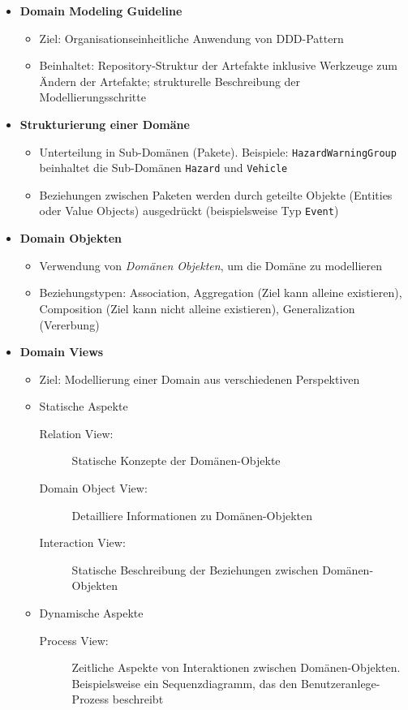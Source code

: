 \begin{itemize}
	\item \textbf{Domain Modeling Guideline}
	\begin{itemize}
		\item Ziel: Organisationseinheitliche Anwendung von DDD-Pattern
		\item Beinhaltet: Repository-Struktur der Artefakte inklusive Werkzeuge zum Ändern der Artefakte; strukturelle Beschreibung der Modellierungsschritte
	\end{itemize}
	\item \textbf{Strukturierung einer Domäne}
	\begin{itemize}
		\item Unterteilung in Sub-Domänen (Pakete). Beispiele: \texttt{HazardWarningGroup} beinhaltet die Sub-Domänen \texttt{Hazard} und \texttt{Vehicle}
		\item Beziehungen zwischen Paketen werden durch geteilte Objekte (Entities oder Value Objects) ausgedrückt (beispielsweise Typ \texttt{Event})
	\end{itemize}
	\item \textbf{Domain Objekten}
	\begin{itemize}
		\item Verwendung von \textit{Domänen Objekten}, um die Domäne zu modellieren
		\item Beziehungstypen: Association, Aggregation (Ziel kann alleine existieren), Composition (Ziel kann nicht alleine existieren), Generalization (Vererbung)
	\end{itemize}
	\item \textbf{Domain Views}
	\begin{itemize}
		\item Ziel: Modellierung einer Domain aus verschiedenen Perspektiven
		\item Statische Aspekte
		\begin{description}
			\item[Relation View:] Statische Konzepte der Domänen-Objekte
			\item[Domain Object View:] Detailliere Informationen zu Domänen-Objekten
			\item[Interaction View:] Statische Beschreibung der Beziehungen zwischen Domänen-Objekten
		\end{description}
		\item Dynamische Aspekte
		\begin{description}
			\item[Process View:] Zeitliche Aspekte von Interaktionen zwischen Domänen-Objekten. Beispielsweise ein Sequenzdiagramm, das den Benutzeranlege-Prozess beschreibt
		\end{description}
	\end{itemize}
\end{itemize}



